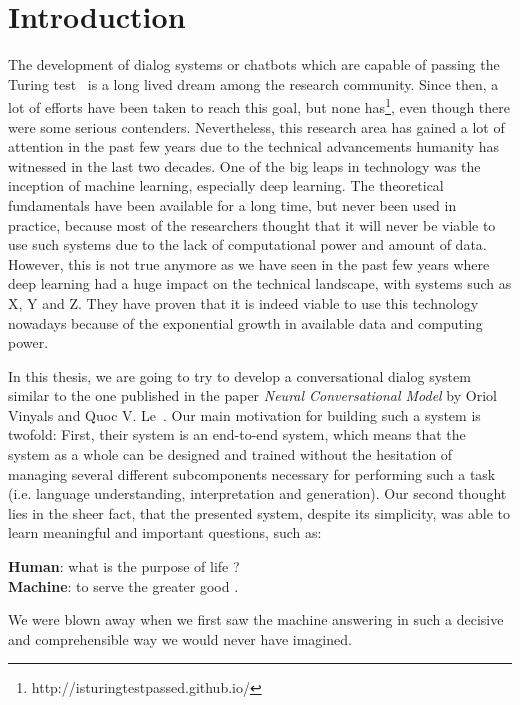 \chapter{Introduction}
The development of dialog systems or chatbots which are capable of passing the Turing test~\cite{Turing:1950} is a long lived dream among the research community. Since then, a lot of efforts have been taken to reach this goal, but none has\footnote{http://isturingtestpassed.github.io/}, even though there were some serious contenders. Nevertheless, this research area has gained a lot of attention in the past few years due to the technical advancements humanity has witnessed in the last two decades. One of the big leaps in technology was the inception of machine learning, especially deep learning. The theoretical fundamentals have been available for a long time, but never been used in practice, because most of the researchers thought that it will never be viable to use such systems due to the lack of computational power and amount of data. However, this is not true anymore as we have seen in the past few years where deep learning had a huge impact on the technical landscape, with systems such as X, Y and Z. They have proven that it is indeed viable to use this technology nowadays because of the exponential growth in available data and computing power.

In this thesis, we are going to try to develop a conversational dialog system similar to the one published in the paper \emph{Neural Conversational Model} by Oriol Vinyals and Quoc V. Le~\cite{Vinyals:2015}. Our main motivation for building such a system is twofold: First, their system is an end-to-end system, which means that the system as a whole can be designed and trained without the hesitation of managing several different subcomponents necessary for performing such a task (i.e. language understanding, interpretation and generation). Our second thought lies in the sheer fact, that the presented system, despite its simplicity, was able to learn meaningful and important questions, such as:

\begin{center}	
	\textbf{Human}: what is the purpose of life ?\\
	\textbf{Machine}: to serve the greater good .
\end{center}

We were blown away when we first saw the machine answering in such a decisive and comprehensible way we would never have imagined.

